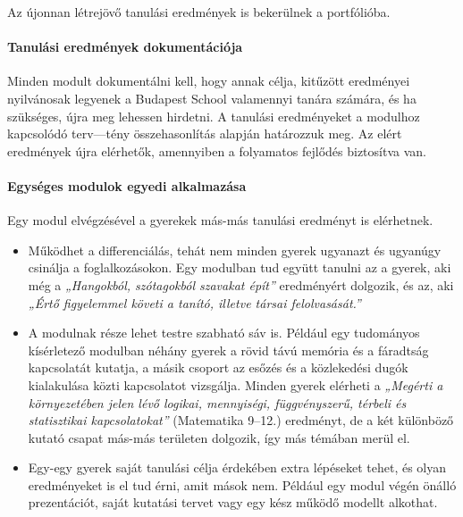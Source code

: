 Az újonnan létrejövő tanulási eredmények is bekerülnek a portfólióba.

\hypertarget{tanulasi-eredmenyek-dokumentacioja}{%
\paragraph{Tanulási eredmények
dokumentációja}\label{tanulasi-eredmenyek-dokumentacioja}}

Minden modult dokumentálni\break
kell, hogy annak célja, kitűzött eredményei
nyilvánosak legyenek a Budapest School valamennyi tanára számára, és ha
szükséges, újra meg lehessen hirdetni. A tanulási eredményeket a
modulhoz kapcsolódó terv---tény összehasonlítás alapján határozzuk
meg. Az elért eredmények újra elérhetők, amennyiben a
folyamatos fejlődés biztosítva van.

\hypertarget{egyseges-modulok-egyedi-alkalmazasa}{%
\paragraph{Egységes modulok egyedi
alkalmazása}\label{egyseges-modulok-egyedi-alkalmazasa}}

Egy modul elvégzésével a gyerekek más-más tanulási eredményt is elérhetnek.

\begin{itemize}
\tightlist
\item
  Működhet a differenciálás, tehát nem minden gyerek ugyanazt és
  ugyanúgy csinálja a foglalkozásokon. Egy modulban tud együtt tanulni
  az a gyerek, aki még a \emph{„Hangokból, szótagokból szavakat épít''}
  eredményért dolgozik, és az, aki \emph{„Értő figyelemmel követi a
  tanító, illetve társai felolvasását.''}
\item
  A modulnak része lehet testre szabható sáv is. Például egy tudományos
  kísérletező modulban néhány gyerek a rövid távú memória és a fáradtság
  kapcsolatát kutatja, a másik csoport az esőzés és a közlekedési dugók
  kialakulása közti kapcsolatot vizsgálja. Minden gyerek elérheti a
  \emph{„Megérti a környezetében jelen lévő logikai, mennyiségi,
  függvényszerű, térbeli és statisztikai kapcsolatokat''} (Matematika 9--12.) eredményt, de a két különböző kutató csapat más-más
  területen dolgozik, így más témában merül el.
\item
  Egy-egy gyerek saját tanulási célja érdekében extra lépéseket tehet,
  és olyan eredményeket is el tud érni, amit mások nem. Például egy
  modul végén önálló prezentációt, saját kutatási tervet vagy egy kész
  működő modellt alkothat.
\end{itemize}

